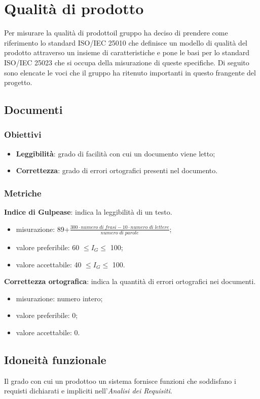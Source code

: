 \section{Qualità di prodotto}
    Per misurare la qualità di prodotto\glosp il gruppo ha deciso di prendere come riferimento lo standard ISO/IEC 25010 che definisce un modello di qualità del prodotto attraverso un insieme di caratteristiche e pone le basi per lo standard ISO/IEC 25023 che si occupa della misurazione di queste specifiche. Di seguito sono elencate le voci che il gruppo ha ritenuto importanti in questo frangente del progetto\glo.
    \subsection{Documenti}
    	\subsubsection{Obiettivi}
    		\begin{itemize}
    			\item \textbf{Leggibilità}: grado di facilità con cui un documento viene letto;
    			\item \textbf{Correttezza}: grado di errori ortografici presenti nel documento.
    		\end{itemize}
	    \subsubsection{Metriche}
	    \textbf{Indice di Gulpease}: indica la leggibilità di un testo.
	    \begin{itemize}
	    	\item misurazione: 89+$\frac{300\cdot numero \; di \; frasi-10\cdot numero \; di \; lettere}{numero \; di \; parole}$;
	    	\item valore preferibile: 60 $\le I_{G} \le$ 100;
	    	\item valore accettabile: 40 $\le I_{G} \le$ 100.
	    \end{itemize}
	    \textbf{Correttezza ortografica}: indica la quantità di errori ortografici nei documenti.
	    \begin{itemize}
	    	\item misurazione: numero intero;
	    	\item valore preferibile: 0;
	    	\item valore accettabile: 0.
	    \end{itemize}
    \subsection{Idoneità funzionale}
        Il grado con cui un prodotto\glosp o un sistema fornisce funzioni che soddisfano i requisti dichiarati e impliciti nell'\textit{Analisi dei Requisiti}.
